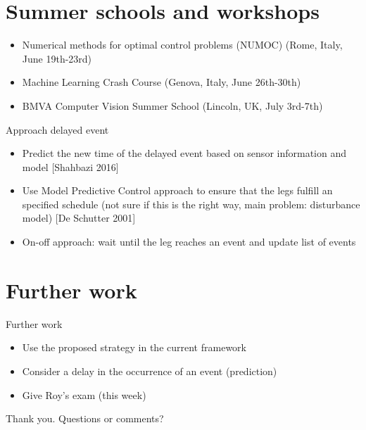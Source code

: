 \documentclass{beamer}
\begin{document}
\section{Summer schools and workshops}
\begin{frame}
	\begin{itemize}\setlength\itemsep{3em}
		\item Numerical methods for optimal control problems (NUMOC) (Rome, Italy, June 19th-23rd)
		\item Machine Learning Crash Course (Genova, Italy, June 26th-30th)
		\item BMVA Computer Vision Summer School (Lincoln, UK, July 3rd-7th)
	\end{itemize}
\end{frame}

\begin{frame}{Approach delayed event}
\begin{itemize}\setlength\itemsep{3em}
	\item Predict the new time of the delayed event based on sensor information and model [Shahbazi 2016]
	\item Use Model Predictive Control approach to ensure that the legs fulfill an specified schedule (not sure if this is the right way, main problem: disturbance model) [De Schutter 2001]
	\item On-off approach: wait until the leg reaches an event and update list of events 
\end{itemize}
\end{frame}


\section{Further work}


\begin{frame}{Further work}
	\begin{itemize}\setlength\itemsep{3em}
		\item Use the proposed strategy in the current framework
		\item Consider a delay in the occurrence of an event (prediction)
		\item Give Roy's exam (this week)
	\end{itemize}
\end{frame}

\begin{frame}
 \hspace{2cm} Thank you. Questions or comments?
\end{frame}
\end{document}
